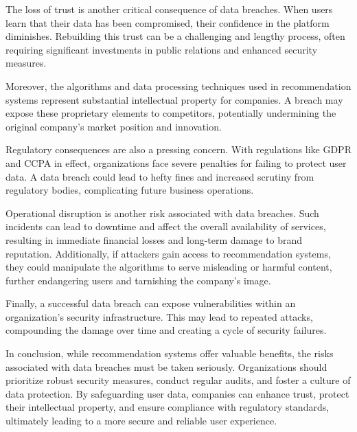 \documentclass[10pt,twoside,slovak,a4paper]{article}
\begin{document}
The loss of trust is another critical consequence of data breaches. When users learn that their data has been compromised, their confidence in the platform diminishes\cite{data}. Rebuilding this trust can be a challenging and lengthy process, often requiring significant investments in public relations and enhanced security measures.


Moreover, the algorithms and data processing techniques used in recommendation systems represent substantial intellectual property for companies. A breach may expose these proprietary elements to competitors, potentially undermining the original company's market position and innovation.

Regulatory consequences are also a pressing concern. With regulations like GDPR and CCPA in effect, organizations face severe penalties for failing to protect user data. A data breach could lead to hefty fines and increased scrutiny from regulatory bodies, complicating future business operations.

Operational disruption is another risk associated with data breaches\cite{info}. Such incidents can lead to downtime and affect the overall availability of services, resulting in immediate financial losses and long-term damage to brand reputation. Additionally, if attackers gain access to recommendation systems, they could manipulate the algorithms to serve misleading or harmful content, further endangering users and tarnishing the company’s image.

Finally, a successful data breach can expose vulnerabilities within an organization’s security infrastructure\cite{data}. This may lead to repeated attacks, compounding the damage over time and creating a cycle of security failures.

In conclusion, while recommendation systems offer valuable benefits, the risks associated with data breaches must be taken seriously. Organizations should prioritize robust security measures, conduct regular audits, and foster a culture of data protection. By safeguarding user data, companies can enhance trust, protect their intellectual property, and ensure compliance with regulatory standards, ultimately leading to a more secure and reliable user experience.


\newpage
\end{document}
